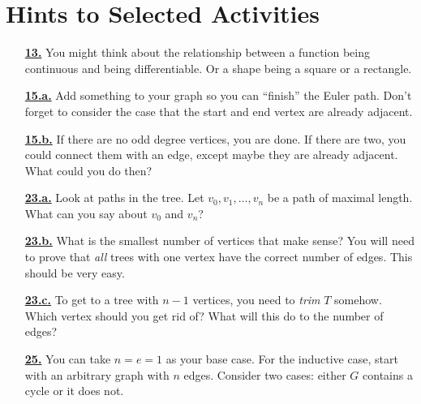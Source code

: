 \documentclass[10pt,]{book}
\theoremstyle{plain}
\theoremstyle{definition}
\theoremstyle{definition}
\theoremstyle{definition}
\numberwithin{equation}{chapter}
\begin{document}
\chapter[{Hints to Selected Activities}]{Hints to Selected Activities}\label{appendix-3}
\begin{itemize}[itemsep=1em]
\hypertarget{a-13}{}\item[\textbf{\hyperref[activity-8]{13.}}]
\hypertarget{p-168}{}%
You might think about the relationship between a function being continuous and being differentiable.  Or a shape being a square or a rectangle.%

\hypertarget{a-15.a}{}\item[\textbf{\hyperref[task-13]{15.a.}}]
\hypertarget{p-181}{}%
Add something to your graph so you can ``finish'' the Euler path.  Don't forget to consider the case that the start and end vertex are already adjacent.%

\hypertarget{a-15.b}{}\item[\textbf{\hyperref[task-14]{15.b.}}]
\hypertarget{p-183}{}%
If there are no odd degree vertices, you are done.  If there are two, you could connect them with an edge, except maybe they are already adjacent.  What could you do then?%

\hypertarget{a-23.a}{}\item[\textbf{\hyperref[task-26]{23.a.}}]
\hypertarget{p-242}{}%
Look at paths in the tree.  Let \(v_0, v_1, \ldots, v_n\) be a path of maximal length.  What can you say about \(v_0\) and \(v_n\)?%

\hypertarget{a-23.b}{}\item[\textbf{\hyperref[task-27]{23.b.}}]
\hypertarget{p-244}{}%
What is the smallest number of vertices that make sense?  You will need to prove that \emph{all} trees with one vertex have the correct number of edges.  This should be very easy.%

\hypertarget{a-23.c}{}\item[\textbf{\hyperref[task-28]{23.c.}}]
\hypertarget{p-246}{}%
To get to a tree with \(n-1\) vertices, you need to \emph{trim} \(T\) somehow.  Which vertex should you get rid of?  What will this do to the number of edges?%

\hypertarget{a-25}{}\item[\textbf{\hyperref[activity-20]{25.}}]
\hypertarget{p-258}{}%
You can take \(n = e = 1\) as your base case.  For the inductive case, start with an arbitrary graph with \(n\) edges.  Consider two cases: either \(G\) contains a cycle or it does not.%


\end{itemize}
\end{document}
